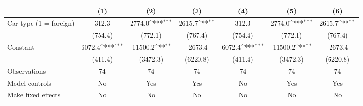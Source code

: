 {
\def\sym#1{\ifmmode^{#1}\else\(^{#1}\)\fi}
\begin{tabular}{l*{6}{c}}
\hline\hline
                &\multicolumn{1}{c}{(1)}         &\multicolumn{1}{c}{(2)}         &\multicolumn{1}{c}{(3)}         &\multicolumn{1}{c}{(4)}         &\multicolumn{1}{c}{(5)}         &\multicolumn{1}{c}{(6)}         \\
\hline
Car type (1 = foreign)&    312.3         &   2774.0\sym{***}&   2615.7\sym{**} &    312.3         &   2774.0\sym{***}&   2615.7\sym{**} \\
                &  (754.4)         &  (772.1)         &  (767.4)         &  (754.4)         &  (772.1)         &  (767.4)         \\
[1em]
Constant        &   6072.4\sym{***}& -11500.2\sym{**} &  -2673.4         &   6072.4\sym{***}& -11500.2\sym{**} &  -2673.4         \\
                &  (411.4)         & (3472.3)         & (6220.8)         &  (411.4)         & (3472.3)         & (6220.8)         \\
\hline
Observations    &       74         &       74         &       74         &       74         &       74         &       74         \\
Model controls  &       No         &      Yes         &      Yes         &       No         &      Yes         &      Yes         \\
Make fixed effects&       No         &       No         &       No         &       No         &       No         &       No         \\
\hline\hline \end{tabular}} \begin{tablenotes} \footnotesize \item \lipsum[1] \end{tablenotes}
